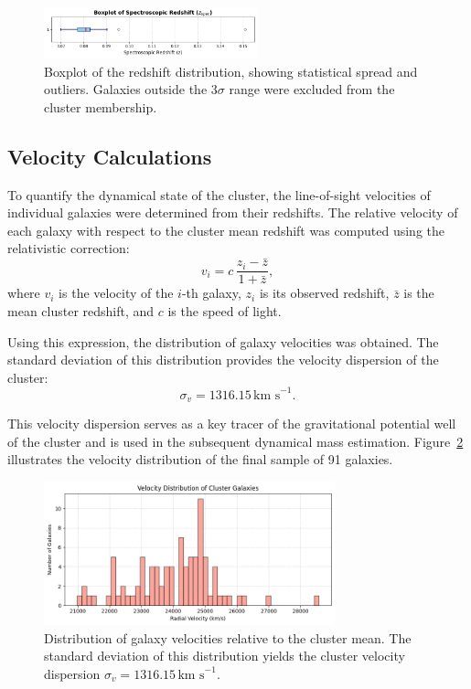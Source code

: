 \documentclass[12pt]{article}
\begin{document}
\begin{figure}[H]
    \centering
    \includegraphics[width=0.55\textwidth]{redshift_box.png}
    \caption{Boxplot of the redshift distribution, showing statistical spread and outliers. 
    Galaxies outside the $3\sigma$ range were excluded from the cluster membership.}
    \label{fig:redshift_box}
\end{figure}

\subsection{Velocity Calculations}
To quantify the dynamical state of the cluster, the line-of-sight velocities of individual galaxies were determined from their redshifts. 
The relative velocity of each galaxy with respect to the cluster mean redshift was computed using the relativistic correction:
\[
    v_i = c \, \frac{z_i - \bar{z}}{1 + \bar{z}},
\]
where $v_i$ is the velocity of the $i$-th galaxy, $z_i$ is its observed redshift, $\bar{z}$ is the mean cluster redshift, 
and $c$ is the speed of light.

Using this expression, the distribution of galaxy velocities was obtained. The standard deviation of this distribution provides 
the velocity dispersion of the cluster:
\[
    \sigma_v = 1316.15 \,\text{km s}^{-1}.
\]

This velocity dispersion serves as a key tracer of the gravitational potential well of the cluster and is used in the subsequent 
dynamical mass estimation. Figure~\ref{fig:velocity_dist} illustrates the velocity distribution of the final sample of 91 galaxies.

\begin{figure}[H]
    \centering
    \includegraphics[width=0.75\textwidth]{velocity_dist.png}
    \caption{Distribution of galaxy velocities relative to the cluster mean. 
    The standard deviation of this distribution yields the cluster velocity dispersion 
    $\sigma_v = 1316.15 \,\text{km s}^{-1}$.}
    \label{fig:velocity_dist}
\end{figure}
\newpage
\end{document}
